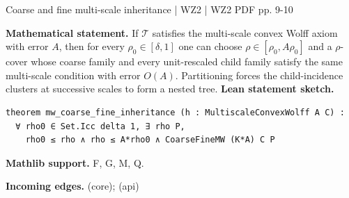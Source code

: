 \documentclass[10pt,a4paper]{article}
\newcommand{\nodecard}[1]{\hyperlink{node-#1}{\texttt{\detokenize{#1}}}}
\begin{document}
\begin{minipage}{\linewidth}
\hypertarget{node-W2L2_13}{}
\begin{tcolorbox}[colback=white,colframe=setupfg,colbacktitle=setupbg,coltitle=ink,boxrule=0.45pt,arc=1.6mm,left=3mm,right=3mm,top=2mm,bottom=2mm,title={\sffamily\bfseries WZ2 Lemma 2.13 \hfill \texttt{W2L2\_13}}]
{\sffamily\small\color{muted}Coarse and fine multi-scale inheritance | WZ2 | WZ2 PDF pp. 9-10}\par
\textbf{Mathematical statement.} If $\mathcal T$ satisfies the multi-scale convex Wolff axiom with error $A$, then for every $\rho_0\in[\delta,1]$ one can choose $\rho\in[\rho_0,A\rho_0]$ and a $\rho$-cover whose coarse family and every unit-rescaled child family satisfy the same multi-scale condition with error $O(A)$.
Partitioning forces the child-incidence clusters at successive scales to form a nested tree.
\smallskip\textbf{Lean statement sketch.}
\begin{Verbatim}[fontsize=\small,breaklines=true,breakanywhere=true,tabsize=2]
theorem mw_coarse_fine_inheritance (h : MultiscaleConvexWolff A C) :
  ∀ rho0 ∈ Set.Icc delta 1, ∃ rho P,
    rho0 ≤ rho ∧ rho ≤ A*rho0 ∧ CoarseFineMW (K*A) C P
\end{Verbatim}
{\footnotesize\textbf{Mathlib support.} F, G, M, Q.\par
\textbf{Incoming edges.} \nodecard{W2MW} (core); \nodecard{Icover} (api)\par}

\end{tcolorbox}\end{minipage}\par\medskip
\end{document}
